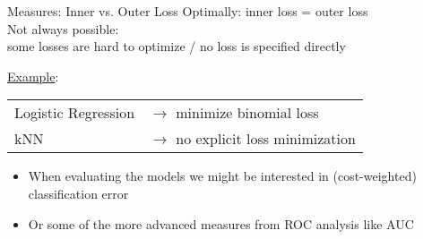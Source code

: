 \documentclass[11pt,compress,t,notes=noshow, xcolor=table]{beamer}
\begin{document}
\begin{vbframe}{Measures: Inner vs. Outer Loss}
\lz
Optimally: inner loss = outer loss\\[.5em]
Not always possible:\\ some losses are hard to optimize / no loss is specified directly\\

\lz

\underline{Example}:\\[.5em]
\begin{tabular}{ll}
Logistic Regression & $\rightarrow$ minimize binomial loss \\
kNN & $\rightarrow$ no explicit loss minimization\\
\end{tabular}
\begin{itemize}
  \item When evaluating the models we might be interested in (cost-weighted) classification error 
  \item Or some of the more advanced measures from ROC analysis like AUC
\end{itemize}


\end{vbframe}

\endlecture
\end{document}
